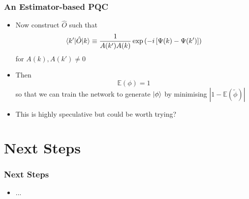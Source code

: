 \documentclass{beamer}
\begin{document}
\begin{frame}
\frametitle{An Estimator-based PQC}
\begin{itemize}
\item Now construct $\hat{O}$ such that 
\begin{equation}
\braket{k' | \hat{O} | k} \equiv \frac{1}{A(k')A(k)}  \exp \left( - i \left[ \Psi(k) - \Psi(k') \right] \right)
\end{equation}
for $A(k), A(k') \neq 0$
\item Then 
\begin{equation}
\mathbb{E}(\phi)=1
\end{equation}
so that we can train the network to generate $\ket{\phi}$ by minimising $|1-\mathbb{E}(\tilde{\phi})|$
\item \alert{This is highly speculative} but could be worth trying?
\end{itemize}
\end{frame}

\section{Next Steps}

\begin{frame}
\frametitle{Next Steps}
\begin{itemize}
\item ...
\end{itemize}
\end{frame}
\end{document}

